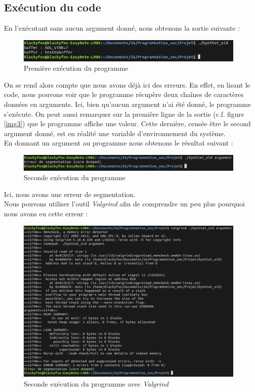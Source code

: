 \subsection{Exécution du code}\label{sec:exe}
En l'exécutant sans aucun argument donné, nous obtenons la sortie suivante :
\begin{figure}[H]
  \centering
  \includegraphics[width=.9\textwidth]{img/exe1.png}
  \caption{Première exécution du programme}
  \label{img:3}
\end{figure}
On se rend alors compte que nous avons déjà ici des erreurs. En effet, en lisant le code, nous pouvons voir que le programme récupère deux chaînes de caractères données en arguments. Ici, bien qu'aucun argument n'ai été donné, le programme s'exécute. On peut aussi remarquer sur la première ligne de la sortie (c.f. figure \ref{img3}) que le programme affiche une valeur. Cette dernière, censée être le second argument donné, est en réalité une variable d'environnement du système.\\
En donnant un argument au programme nous obtenons le résultat suivant :
\begin{figure}[H]
  \centering
  \includegraphics[width=.9\textwidth]{img/exe2.png}
  \caption{Seconde exécution du programme}
  \label{img:4}
\end{figure}
Ici, nous avons une erreur de segmentation.\\
Nous pouvons utiliser l'outil \textit{Valgrind} afin de comprendre un peu plus pourquoi nous avons eu cette erreur :
\begin{figure}[H]
  \centering
  \includegraphics[width=.9\textwidth]{img/valg1.png}
  \caption{Seconde exécution du programme avec \textit{Valgrind}}
  \label{img:5}
\end{figure}

